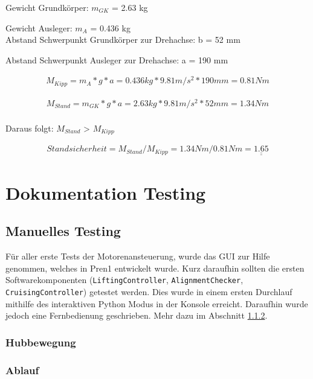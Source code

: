 Gewicht Grundkörper: $m_{GK}$ = 2.63 kg

Gewicht Ausleger: $m_{A}$ = 0.436 kg\\

Abstand Schwerpunkt Grundkörper zur Drehachse: b = 52 mm

Abstand Schwerpunkt Ausleger zur Drehachse: a = 190 mm

\newpage

\begin{align*}
M_{Kipp} = m_{A} * g * a = 0.436 kg * 9.81 m/s^2 * 190 mm = 0.81 Nm
\end{align*}

\begin{align*}
M_{Stand} = m_{GK} * g * a = 2.63 kg * 9.81 m/s^2 * 52 mm = 1.34 Nm
\end{align*}\\

Daraus folgt: $M_{Stand}$ > $M_{Kipp}$

\begin{align*}
Standsicherheit = M_{Stand} / M_{Kipp} = 1.34 Nm / 0.81 Nm = \underline{\underline{1.65}}
\end{align*}







\newpage

\section{Dokumentation Testing}

\subsection{Manuelles Testing}
Für aller erste Tests der Motorenansteuerung, wurde das GUI zur Hilfe genommen, welches in Pren1 entwickelt wurde. Kurz daraufhin sollten die ersten Softwarekomponenten (\texttt{LiftingController}, \texttt{AlignmentChecker}, \texttt{CruisingController}) getestet werden. Dies wurde in einem ersten Durchlauf mithilfe des interaktiven Python Modus in der Konsole erreicht. Daraufhin wurde jedoch eine Fernbedienung geschrieben. Mehr dazu im Abschnitt \ref{}.

\subsubsection{Hubbewegung}

\subsubsection{Ablauf}

